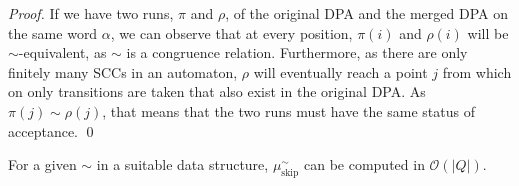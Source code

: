 \begin{proof}
	If we have two runs, $\pi$ and $\rho$, of the original DPA and the merged DPA on the same word $\alpha$, we can observe that at every position, $\pi(i)$ and $\rho(i)$ will be $\sim$-equivalent, as $\sim$ is a congruence relation. Furthermore, as there are only finitely many SCCs in an automaton, $\rho$ will eventually reach a point $j$ from which on only transitions are taken that also exist in the original DPA. As $\pi(j) \sim \rho(j)$, that means that the two runs must have the same status of acceptance. \qed
\end{proof}

\begin{theorem}
	For a given $\sim$ in a suitable data structure, $\mu_\text{skip}^\sim$ can be computed in $\mathcal{O}(|Q|)$.
\end{theorem}

